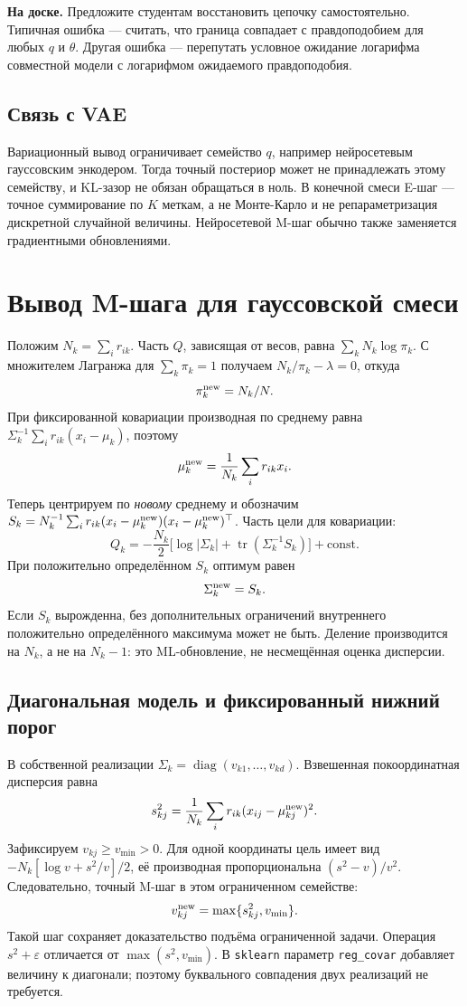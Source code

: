 \documentclass[11pt,a4paper]{article}
\newcommand{\diag}{\operatorname{diag}}
\newcommand{\tr}{\operatorname{tr}}
\newcommand{\board}[1]{\par\textbf{На доске.} #1\par}
\begin{document}
\board{Предложите студентам восстановить цепочку самостоятельно.
Типичная ошибка --- считать, что граница совпадает с правдоподобием
для любых $q$ и $\theta$. Другая ошибка --- перепутать условное ожидание
логарифма совместной модели с логарифмом ожидаемого правдоподобия.}

\subsection{Связь с VAE}
Вариационный вывод ограничивает семейство $q$, например нейросетевым
гауссовским энкодером. Тогда точный постериор может не принадлежать этому
семейству, и KL-зазор не обязан обращаться в ноль. В конечной смеси
E-шаг --- точное суммирование по $K$ меткам, а не Монте-Карло и не
репараметризация дискретной случайной величины. Нейросетевой M-шаг обычно
также заменяется градиентными обновлениями.

\section{Вывод M-шага для гауссовской смеси}

Положим $N_k=\sum_i r_{ik}$. Часть $Q$, зависящая от весов,
равна $\sum_kN_k\log\pi_k$. С множителем Лагранжа для $\sum_k\pi_k=1$
получаем $N_k/\pi_k-\lambda=0$, откуда
\[
 \pi_k^{\rm new}=N_k/N.
\]
При фиксированной ковариации производная по среднему равна
$\Sigma_k^{-1}\sum_i r_{ik}(x_i-\mu_k)$, поэтому
\[
 \mu_k^{\rm new}=\frac1{N_k}\sum_i r_{ik}x_i.
\]
Теперь центрируем по \emph{новому} среднему и обозначим
$S_k=N_k^{-1}\sum_i r_{ik}(x_i-\mu_k^{\rm new})(x_i-\mu_k^{\rm new})^\top$.
Часть цели для ковариации:
\[
 Q_k=-\frac{N_k}{2}\bigl[\log|\Sigma_k|+
                         \tr(\Sigma_k^{-1}S_k)\bigr]+\mathrm{const}.
\]
При положительно определённом $S_k$ оптимум равен
\[
 \Sigma_k^{\rm new}=S_k.
\]
Если $S_k$ вырожденна, без дополнительных ограничений внутреннего
положительно определённого максимума может не быть. Деление производится
на $N_k$, а не на $N_k-1$: это ML-обновление, не несмещённая оценка дисперсии.

\subsection{Диагональная модель и фиксированный нижний порог}
В собственной реализации $\Sigma_k=\diag(v_{k1},\ldots,v_{kd})$.
Взвешенная покоординатная дисперсия равна
\[
 s_{kj}^2=\frac1{N_k}\sum_i r_{ik}(x_{ij}-\mu_{kj}^{\rm new})^2.
\]
Зафиксируем $v_{kj}\geq v_{\min}>0$. Для одной координаты цель имеет вид
$-N_k[\log v+s^2/v]/2$, её производная пропорциональна $(s^2-v)/v^2$.
Следовательно, точный M-шаг в этом ограниченном семействе:
\[
 v_{kj}^{\rm new}=\max\{s_{kj}^2,v_{\min}\}.
\]
Такой шаг сохраняет доказательство подъёма ограниченной задачи.
Операция $s^2+\varepsilon$ отличается от $\max(s^2,v_{\min})$.
В \texttt{sklearn} параметр \texttt{reg\_covar} добавляет величину к диагонали;
поэтому буквального совпадения двух реализаций не требуется.
\end{document}
